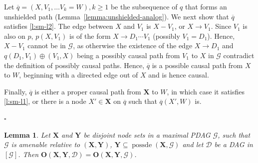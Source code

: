 \documentclass[11pt,a4paper]{article}
\newtheorem{Lemma}[Satz]{Lemma}
\theoremstyle{definition}
\theoremstyle{remark}
\newenvironment{proofof}[1][]{\begin{trivlist}
\item[\hskip \labelsep {\textit{Proof of #1.}}]}{\hfill{}$\square$\end{trivlist}}
\DeclareMathOperator{\possde}{possde}
\newcommand{\mpdag}{maximal PDAG}
\newcommand{\g}[1][G]{\mathcal{#1}}
\newcommand{\optb}[2][X,Y]{\mathbf{O}(\mathbf{#1},#2)}
\begin{document}
\begin{proofof}[Lemma~\ref{lemma:additional-1}]
		Let $\overline{q} = ( X ,V_1, \dots V_{k}=W), k \ge 1$ be the subsequence of $q$ that forms an unshielded path (Lemma~\ref{lemma:unshielded-analog}). We next show that $\overline{q}$ satisfies \ref{l:sm-l2}.
		The edge between $X$ and $V_1$ is $X - V_1$, or $X \rightarrow V_1$. Since $V_1$ is also on $p$, $p(X,V_1)$ is of the form $X \rightarrow D_1 \cdots V_1$ (possibly $V_1=D_1$). Hence, $X - V_1$ cannot be in $\g$, as otherwise the existence of the edge $X \rightarrow D_1$ and $q(D_1,V_1) \oplus ( V_1,X)$ being a possibly causal path from $V_1$ to $X$ in $\g$ contradict the definition of possibly causal paths. 
		Hence, $\overline{q}$ is a possible causal path from $X$ to $W$, beginning with a directed edge out of $X$ and is hence causal.	%
		
		Finally, $\overline{q}$ is either a proper causal path from $\mathbf{X}$  to $W$, in which case it satisfies \ref{l:sm-l1}, or there is a node $X' \in \mathbf{X}$ on $\overline{q}$ such that $\overline{q}(X',W)$ is.

\end{proofof}



\begin{Lemma}
	Let $\mathbf{X}$ and $\mathbf{Y}$ be disjoint node sets in a \mpdag{} $\g$, such that $\g$ is amenable relative to $(\mathbf{X,Y})$, $\mathbf{Y} \subseteq \possde(\mathbf{X},\g)$ and let $\g[D]$ be a DAG in $[\g]$.
	Then  
	$\optb{\g[D]} = \optb{\g}$.
	\label{lemma:optimalSetEquiv}
\end{Lemma}
\end{document}
